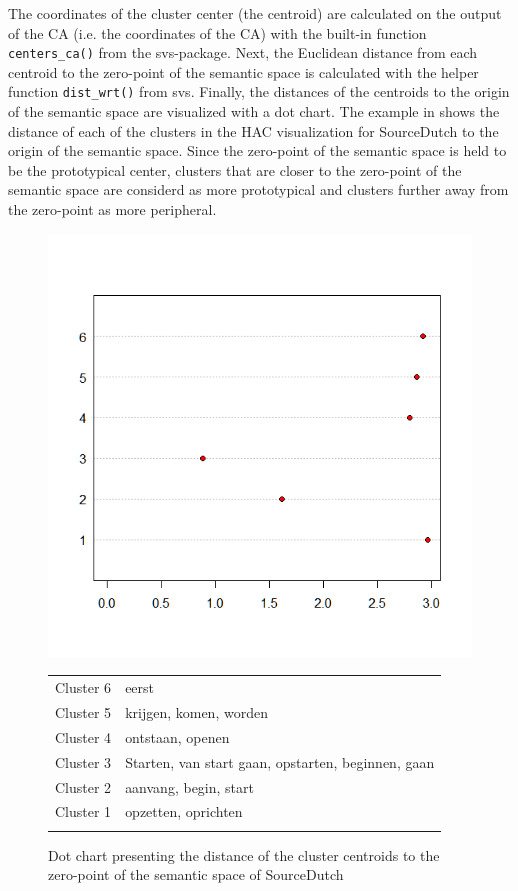 The coordinates of the cluster center (the centroid) are calculated on the output of the CA (i.e. the coordinates of the CA) with the built-in function \texttt{centers\_ca()} from the svs{}-package. Next, the Euclidean distance from each centroid to the zero-point of the semantic space is calculated with the helper function \texttt{dist\_wrt()} from svs. Finally, the distances of the centroids to the origin of the semantic space are visualized with a dot chart. The example in  shows the distance of each of the clusters in the HAC visualization for SourceDutch to the origin of the semantic space. Since the zero-point of the semantic space is held to be the prototypical center, clusters that are closer to the zero-point of the semantic space are considerd as more prototypical and clusters further away from the zero-point as more peripheral. 

\begin{figure}
\includegraphics[height=.4\textheight]{figures/Vandevoorde2-img48.png}
\scriptsize
\begin{tabular}{ll}
\lsptoprule
Cluster 6 & eerst\\
Cluster 5 & krijgen, komen, worden\\
Cluster 4 & ontstaan, openen\\
Cluster 3 & Starten, van start gaan, opstarten, beginnen, gaan\\
Cluster 2 & aanvang, begin, start\\
Cluster 1 & opzetten, oprichten\\
\lspbottomrule
\end{tabular}
\normalsize
\caption{\label{fig:3:48}  Dot chart presenting the distance of the cluster centroids to the zero-point of the semantic space of SourceDutch}
\end{figure}


